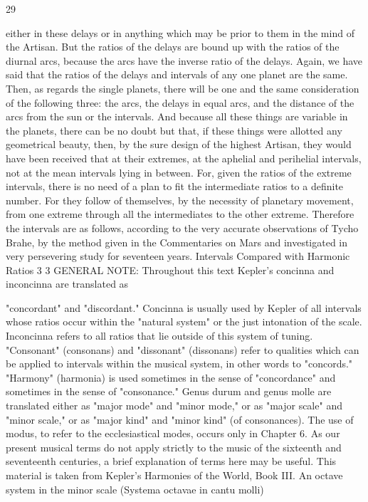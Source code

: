 \documentclass{article}
\begin{document}
29

either in these delays or in anything which may be prior to them in the
mind of the Artisan. But the ratios of the delays are bound up with the
ratios of the diurnal arcs, because the arcs have the inverse ratio of the
delays. Again, we have said that the ratios of the delays and intervals of
any one planet are the same. Then, as regards the single planets, there
will be one and the same consideration of the following three: the arcs,
the delays in equal arcs, and the distance of the arcs from the sun or the
intervals. And because all these things are variable in the planets, there
can be no doubt but that, if these things were allotted any geometrical
beauty, then, by the sure design of the highest Artisan, they would have
been received that at their extremes, at the aphelial and perihelial
intervals, not at the mean intervals lying in between. For, given the ratios
of the extreme intervals, there is no need of a plan to fit the intermediate
ratios to a definite number. For they follow of themselves, by the
necessity of planetary movement, from one extreme through all the
intermediates to the other extreme.
Therefore the intervals are as follows, according to the very accurate
observations of Tycho Brahe, by the method given in the Commentaries
on Mars and investigated in very persevering study for seventeen years.
Intervals Compared with Harmonic Ratios 3
3 GENERAL NOTE: Throughout this text Kepler's concinna and inconcinna are translated as

"concordant" and "discordant." Concinna is usually used by Kepler of all intervals whose ratios occur
within the "natural system" or the just intonation of the scale. Inconcinna refers to all ratios that lie
outside of this system of tuning. "Consonant" (consonans) and "dissonant" (dissonans) refer to
qualities which can be applied to intervals within the musical system, in other words to "concords."
"Harmony" (harmonia) is used sometimes in the sense of "concordance" and sometimes in the sense
of "consonance."
Genus durum and genus molle are translated either as "major mode" and "minor mode," or as "major
scale" and "minor scale," or as "major kind" and "minor kind" (of consonances). The use of modus, to
refer to the ecclesiastical modes, occurs only in Chapter 6.
As our present musical terms do not apply strictly to the music of the sixteenth and seventeenth
centuries, a brief explanation of terms here may be useful. This material is taken from Kepler's
Harmonies of the World, Book III.
An octave system in the minor scale (Systema octavae in cantu molli)
\end{document}
